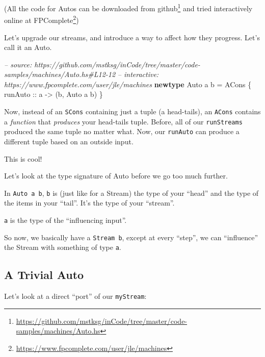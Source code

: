 \documentclass[]{article}
\newenvironment{Shaded}{\begin{snugshade}}{\end{snugshade}}
\newcommand{\CommentTok}[1]{\textcolor[rgb]{0.56,0.35,0.01}{\textit{#1}}}
\newcommand{\DataTypeTok}[1]{\textcolor[rgb]{0.13,0.29,0.53}{#1}}
\newcommand{\FunctionTok}[1]{\textcolor[rgb]{0.00,0.00,0.00}{#1}}
\newcommand{\KeywordTok}[1]{\textcolor[rgb]{0.13,0.29,0.53}{\textbf{#1}}}
\newcommand{\NormalTok}[1]{#1}
\newcommand{\OtherTok}[1]{\textcolor[rgb]{0.56,0.35,0.01}{#1}}
\renewcommand{\href}[2]{#2\footnote{\url{#1}}}
\begin{document}
(All the code for Autos can be downloaded
\href{https://github.com/mstksg/inCode/tree/master/code-samples/machines/Auto.hs}{from
github} and tried interactively online
\href{https://www.fpcomplete.com/user/jle/machines}{at FPComplete})

Let's upgrade our streams, and introduce a way to affect how they progress.
Let's call it an Auto.

\begin{Shaded}
\begin{Highlighting}[]
\CommentTok{-- source: https://github.com/mstksg/inCode/tree/master/code-samples/machines/Auto.hs#L12-12}
\CommentTok{-- interactive: https://www.fpcomplete.com/user/jle/machines}
\KeywordTok{newtype} \DataTypeTok{Auto}\NormalTok{ a b }\FunctionTok{=} \DataTypeTok{ACons}\NormalTok{ \{}\OtherTok{ runAuto ::}\NormalTok{ a }\OtherTok{->}\NormalTok{ (b, }\DataTypeTok{Auto}\NormalTok{ a b) \}}
\end{Highlighting}
\end{Shaded}

Now, instead of an \texttt{SCons} containing just a tuple (a head-tails), an
\texttt{ACons} contains a \emph{function} that \emph{produces} your head-tails
tuple. Before, all of our \texttt{runStreams} produced the same tuple no matter
what. Now, our \texttt{runAuto} can produce a different tuple based on an
outside input.

This is cool!

Let's look at the type signature of Auto before we go too much further.

In \texttt{Auto\ a\ b}, \texttt{b} is (just like for a Stream) the type of your
``head'' and the type of the items in your ``tail''. It's the type of your
``stream''.

\texttt{a} is the type of the ``influencing input''.

So now, we basically have a \texttt{Stream\ b}, except at every ``step'', we can
``influence'' the Stream with something of type \texttt{a}.

\hypertarget{a-trivial-auto}{%
\subsection{A Trivial Auto}\label{a-trivial-auto}}

Let's look at a direct ``port'' of our \texttt{myStream}:
\end{document}
